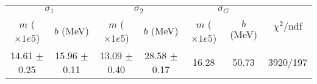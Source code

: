 \begin{tabular}{cc|cc|cc||c}
\multicolumn{2}{c|}{$\sigma_1$} & \multicolumn{2}{|c}{$\sigma_2$} & \multicolumn{2}{|c}{$\sigma_G$}  & \multirow{2}{*}{$\chi^2/$ndf}\\
$m$ ($\times1e5$) & $b$ (MeV) & $m$ ($\times1e5$) & $b$ (MeV) & $m$ ($\times1e5$) & $b$ (MeV) & \\
\hline
14.61 $\pm$ 0.25 & 15.96 $\pm$ 0.11 & 13.09 $\pm$ 0.40 & 28.58 $\pm$ 0.17 & 16.28 & 50.73 & 3920/197\\
\end{tabular}
